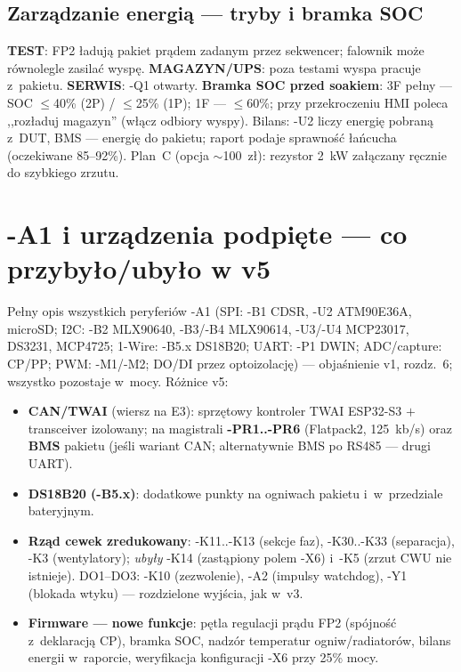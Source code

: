 \documentclass[11pt,a4paper]{article}
\begin{document}
\subsection{Zarządzanie energią --- tryby i bramka SOC}
\textbf{TEST}: FP2 ładują pakiet prądem zadanym przez sekwencer; falownik może równolegle zasilać wyspę.
\textbf{MAGAZYN/UPS}: poza testami wyspa pracuje z~pakietu. \textbf{SERWIS}: -Q1 otwarty. \textbf{Bramka SOC
przed soakiem}: 3F pełny --- SOC $\le$40\% (2P) / $\le$25\% (1P); 1F --- $\le$60\%; przy przekroczeniu HMI
poleca ,,rozładuj magazyn'' (włącz odbiory wyspy). Bilans: -U2 liczy energię pobraną z~DUT, BMS --- energię
do pakietu; raport podaje sprawność łańcucha (oczekiwane 85--92\%). Plan~C (opcja $\sim$100~zł): rezystor
2~kW załączany ręcznie do szybkiego zrzutu.

\section{-A1 i urządzenia podpięte --- co przybyło/ubyło w v5}
Pełny opis wszystkich peryferiów -A1 (SPI: -B1 CDSR, -U2 ATM90E36A, microSD; I2C: -B2 MLX90640,
-B3/-B4 MLX90614, -U3/-U4 MCP23017, DS3231, MCP4725; 1-Wire: -B5.x DS18B20; UART: -P1 DWIN; ADC/capture:
CP/PP; PWM: -M1/-M2; DO/DI przez optoizolację) --- objaśnienie v1, rozdz.~6; wszystko pozostaje w~mocy.
Różnice v5:
\begin{itemize}
\item \textbf{CAN/TWAI} (wiersz na E3): sprzętowy kontroler TWAI ESP32-S3 $+$ transceiver izolowany;
na magistrali \textbf{-PR1..-PR6} (Flatpack2, 125~kb/s) oraz \textbf{BMS} pakietu (jeśli wariant CAN;
alternatywnie BMS po RS485 --- drugi UART).
\item \textbf{DS18B20 (-B5.x)}: dodatkowe punkty na ogniwach pakietu i~w~przedziale bateryjnym.
\item \textbf{Rząd cewek zredukowany}: -K11..-K13 (sekcje faz), -K30..-K33 (separacja), -K3 (wentylatory);
\emph{ubyły} -K14 (zastąpiony polem -X6) i~-K5 (zrzut CWU nie istnieje). DO1--DO3: -K10 (zezwolenie),
-A2 (impulsy watchdog), -Y1 (blokada wtyku) --- rozdzielone wyjścia, jak w~v3.
\item \textbf{Firmware --- nowe funkcje}: pętla regulacji prądu FP2 (spójność z~deklaracją CP), bramka SOC,
nadzór temperatur ogniw/radiatorów, bilans energii w~raporcie, weryfikacja konfiguracji -X6 przy 25\% mocy.
\end{itemize}
\end{document}
